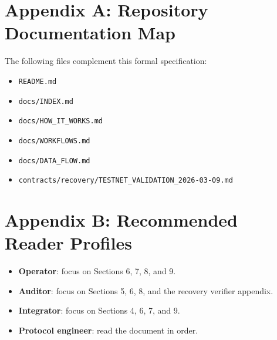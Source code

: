 \documentclass[11pt]{article}
\newcommand{\code}[1]{\texttt{#1}}
\begin{document}
\section{Appendix A: Repository Documentation Map}
The following files complement this formal specification:
\begin{itemize}
  \item \code{README.md}
  \item \code{docs/INDEX.md}
  \item \code{docs/HOW\_IT\_WORKS.md}
  \item \code{docs/WORKFLOWS.md}
  \item \code{docs/DATA\_FLOW.md}
  \item \code{contracts/recovery/TESTNET\_VALIDATION\_2026-03-09.md}
\end{itemize}

\section{Appendix B: Recommended Reader Profiles}
\begin{itemize}
  \item \textbf{Operator}: focus on Sections 6, 7, 8, and 9.
  \item \textbf{Auditor}: focus on Sections 5, 6, 8, and the recovery verifier appendix.
  \item \textbf{Integrator}: focus on Sections 4, 6, 7, and 9.
  \item \textbf{Protocol engineer}: read the document in order.
\end{itemize}
\end{document}
